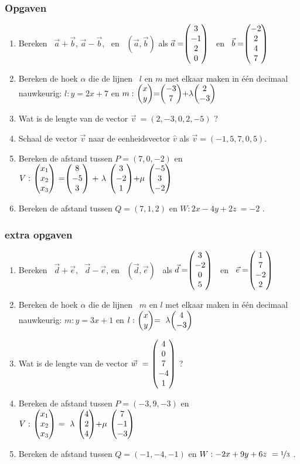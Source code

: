 \documentclass[hidelinks, a4wide, 12pt,  twoside]{book}
\begin{document}
\subsubsection{Opgaven}
\begin{enumerate}
	\item  Bereken \ $ \vec{a} + \vec{b} $, \quad $ \vec{a} - \vec{b} $, \ en \ $  (\vec{a} , \vec{b}) $  als $ \vec{a} = \vecvier{3}{-1}{2}{0}  $ \  en \  $  \vec{b} =  \vecvier{-2}{2}{4}{7} $
	
	\item  Bereken de hoek $\alpha$ die de  lijnen \ $  l $ en $ m $ met elkaar maken in één decimaal nauwkeurig:
	$ l:  y = 2x +7  $ en $ m: \  \vectwee{x}{y} = \vectwee{-3}{7} + \lambda \vectwee{2}{-3}  $
	
	\item Wat is de lengte van de vector $  \vec{v} \ = (2, -3, 0, 2, -5) $ ?
	
	\item Schaal de vector $  \vec{v} $ naar de eenheidsvector $\hat{v}$
	als $  \vec{v} = (-1, 5, 7, 0, 5) $.
	
	\item Bereken de afstand tussen  $  P = (7,0,-2)  $ en 
	$ V: \ \vecdriesnel{x} \
	=  \vecdrie {8} {-5} {3}  \
	+  \ \lambda \ \vecdrie{3}{-2}{1} 
	+ \mu \  \vecdrie{-5}{3}{-2} $ 
	
	\item   Bereken de afstand tussen  $  Q = (7,1,2)  $ en 
	$ W:2x - 4y +2z \ = -2 $ .
	
\end{enumerate}

\subsubsection{extra opgaven}
\begin{enumerate}
	\item Bereken 
	\ $ \vec{d} + \vec{e} $, \ $ \vec{d} - \vec{e} $, en \ $  (\vec{d} , \vec{e}) $ \ als 
	\quad $ \vec{d} = \vecvier{3}{-2}{0}{5}  $ \  en \  $  \vec{e} =  \vecvier{1}{7}{-2}{2} $ 	
	
	\item  Bereken de hoek $\alpha$ die de  lijnen \ $  m $ en $ l $ met elkaar maken in één decimaal nauwkeurig:
	$ m:  y = 3x + 1  $ en $ l: \  \vectwee{x}{y} = \  \lambda \vectwee{4}{-3}  $
	
	\item Wat is de lengte van de vector $  \vec{w} \ = \ \vecvijf{4}{0}{7}{-4}{1} $ ?
	
	\item Bereken de afstand tussen  $  P = (-3,9,-3)  $ en 
	$ V: \ \vecdriesnel{x} \ =  \ \lambda \ \vecdrie{4}{2}{4} + \mu \  \vecdrie{7}{-1}{-3} $	
	
	\item   Bereken de afstand tussen  $  Q = (-1,-4,-1)  $ en 
	$ W: -2x + 9y + 6z \ = \nicefrac{1}{3} $ .
\end{enumerate}
\end{document}

